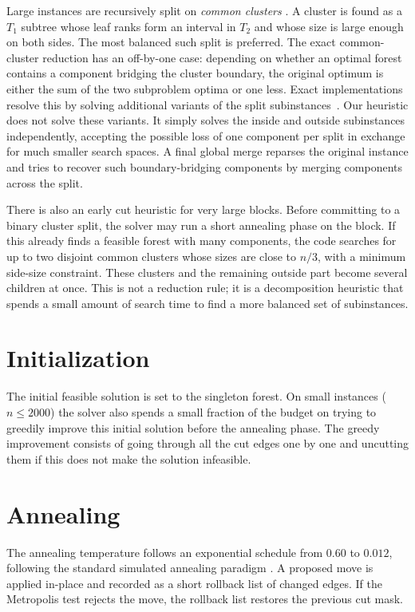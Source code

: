 \documentclass[a4paper,UKenglish,cleveref,autoref]{lipics-v2021}
\begin{document}
Large instances are recursively split on \emph{common clusters}
\cite{bordewich2005,linzsemple2011,LiZ17}.  A cluster is found as a
\(T_1\) subtree whose leaf ranks form an interval in \(T_2\) and whose size is
large enough on both sides.  The most balanced such split is preferred.  The
exact common-cluster reduction has an off-by-one case: depending on whether an
optimal forest contains a component bridging the cluster boundary, the original
optimum is either the sum of the two subproblem optima or one less.  Exact
implementations resolve this by solving additional variants of the split
subinstances~\cite{Kelk26}.  Our heuristic does not solve these variants.  It simply solves
the inside and outside subinstances independently, accepting the possible loss
of one component per split in exchange for much smaller search spaces.  A final
global merge reparses the original instance and tries to recover such
boundary-bridging components by merging components across the split.

There is also an early cut heuristic for very large blocks.  Before committing
to a binary cluster split, the solver may run a short annealing phase on the
block.  If this already finds a feasible forest with many components, the code
searches for up to two disjoint common clusters whose sizes are close to
\(n/3\), with a minimum side-size constraint.  These clusters and the remaining
outside part become several children at once.  This is not a reduction rule; it
is a decomposition heuristic that spends a small amount of search time to find
a more balanced set of subinstances.

\section{Initialization}

The initial feasible solution is set to the singleton forest.
On small instances ($n \leq 2000$) the solver also spends a small fraction of
the budget on trying to greedily improve this initial solution before the
annealing phase. The greedy improvement consists of going through all the cut
edges one by one and uncutting them if this does not make the solution infeasible.

\section{Annealing}

The annealing temperature follows an exponential schedule from \(0.60\) to \(0.012\),
following the standard simulated annealing paradigm \cite{kirkpatrick1983}.
A proposed move is applied in-place and recorded as a short rollback list of changed edges.
If the Metropolis test rejects the move, the rollback list restores the previous cut
mask.
\end{document}
